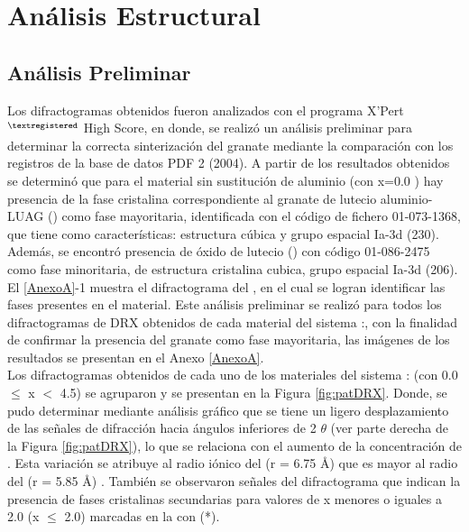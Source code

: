 \chapter{Análisis Estructural}

\section{Análisis Preliminar}
Los difractogramas obtenidos fueron analizados con el programa
X'Pert$^{\textregistered}$ High Score, en donde, se realizó un análisis preliminar
para determinar la correcta sinterización del granate mediante la comparación
con los registros de la base de datos PDF 2 (2004). A partir de los resultados
obtenidos se determinó que para el material sin sustitución de aluminio (con
x=0.0 ) hay presencia de la fase cristalina correspondiente al
granate de lutecio aluminio-LUAG () como fase mayoritaria,
identificada con el código de fichero 01-073-1368, que tiene como
características: estructura cúbica y grupo espacial Ia-3d (230). Además, se
encontró presencia de óxido de lutecio () con código 01-086-2475 como
fase minoritaria, de estructura cristalina cubica, grupo espacial Ia-3d (206).
El \ref{AnexoA}-1 muestra el difractograma del , en el cual se logran
identificar las fases presentes en el material. Este análisis preliminar se
realizó para todos los difractogramas de DRX obtenidos de cada material del sistema
:, con la finalidad de confirmar la
presencia del granate como fase mayoritaria, las imágenes de los resultados se
presentan en el Anexo \ref{AnexoA}.\\

Los difractogramas obtenidos de cada uno de los materiales del sistema
: (con 0.0 $\leq$ x $<$ 4.5) se agruparon
y se presentan en la Figura \ref{fig:patDRX}. Donde, se pudo determinar
mediante análisis gráfico que se tiene un ligero desplazamiento de las señales
de difracción hacia ángulos inferiores de 2 $\theta$ (ver parte derecha de la
Figura \ref{fig:patDRX}), lo que se relaciona con el aumento de la
concentración de . Esta variación se atribuye al radio iónico del
 (r = 6.75 \r{A}) que es mayor al radio del  (r = 5.85
\r{A}) \cite{Deng2013}. También se observaron señales del difractograma que indican la
presencia de fases cristalinas secundarias para valores de x menores o iguales
a 2.0 (x $\leq$ 2.0) marcadas en la  con (*).

